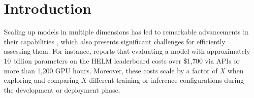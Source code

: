 \section{Introduction}


Scaling up models in multiple dimensions has led to remarkable advancements in their capabilities \citep{llama2,insgpt}, which also presents significant challenges for efficiently assessing them. For instance, \citet{liang2022holistic} reports that evaluating a model with approximately 10 billion parameters on the HELM leaderboard costs over \$1,700 via APIs or more than 1,200 GPU hours. Moreover, these costs scale by a factor of $X$ when exploring and comparing $X$ different training or inference configurations during the development or deployment phase.



